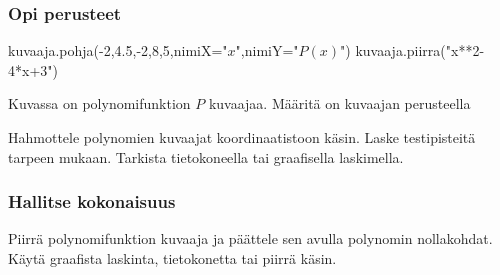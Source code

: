 \begin{tehtavasivu}

\subsubsection*{Opi perusteet}

\begin{tehtava}

\begin{kuva}
	kuvaaja.pohja(-2,4.5,-2,8,5,nimiX="$x$",nimiY="$P(x)$")
	kuvaaja.piirra("x**2-4*x+3")
\end{kuva}
Kuvassa on polynomifunktion $P$ kuvaajaa. Määritä on kuvaajan perusteella
\begin{vastaus}
	\end{vastaus}
\end{tehtava}

\begin{tehtava}
    Hahmottele polynomien kuvaajat koordinaatistoon käsin. Laske testipisteitä tarpeen mukaan. Tarkista tietokoneella tai graafisella laskimella.
    \begin{vastaus}
    \end{vastaus}
\end{tehtava}

\subsubsection*{Hallitse kokonaisuus}

\begin{tehtava}
Piirrä polynomifunktion kuvaaja ja päättele sen avulla polynomin nollakohdat. Käytä graafista laskinta, tietokonetta tai piirrä käsin.
	\begin{vastaus}
	\end{vastaus}
\end{tehtava}


\end{tehtavasivu}
